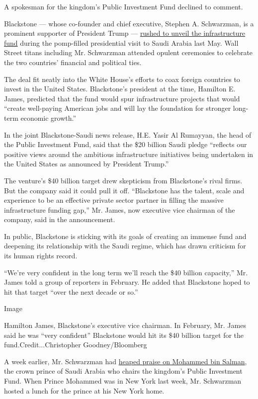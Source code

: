 A spokesman for the kingdom's Public Investment Fund declined to
comment.

Blackstone --- whose co-founder and chief executive, Stephen A.
Schwarzman, is a prominent supporter of President Trump ---
\href{https://www.nytimes3xbfgragh.onion/2017/08/19/business/the-benefits-of-standing-by-the-president.html}{rushed
to unveil the infrastructure fund} during the pomp-filled presidential
visit to Saudi Arabia last May. Wall Street titans including Mr.
Schwarzman attended opulent ceremonies to celebrate the two countries'
financial and political ties.

The deal fit neatly into the White House's efforts to coax foreign
countries to invest in the United States. Blackstone's president at the
time, Hamilton E. James, predicted that the fund would spur
infrastructure projects that would ``create well-paying American jobs
and will lay the foundation for stronger long-term economic growth.''

In the joint Blackstone-Saudi news release, H.E. Yasir Al Rumayyan, the
head of the Public Investment Fund, said that the \$20 billion Saudi
pledge ``reflects our positive views around the ambitious infrastructure
initiatives being undertaken in the United States as announced by
President Trump.''

The venture's \$40 billion target drew skepticism from Blackstone's
rival firms. But the company said it could pull it off. ``Blackstone has
the talent, scale and experience to be an effective private sector
partner in filling the massive infrastructure funding gap,'' Mr. James,
now executive vice chairman of the company, said in the announcement.

In public, Blackstone is sticking with its goals of creating an immense
fund and deepening its relationship with the Saudi regime, which has
drawn criticism for its human rights record.

``We're very confident in the long term we'll reach the \$40 billion
capacity,'' Mr. James told a group of reporters in February. He added
that Blackstone hoped to hit that target ``over the next decade or so.''

Image

Hamilton James, Blackstone's executive vice chairman. In February, Mr.
James said he was ``very confident'' Blackstone would hit its \$40
billion target for the fund.Credit...Christopher Goodney/Bloomberg

A week earlier, Mr. Schwarzman had
\href{https://www.cnbc.com/2018/01/25/blackstone-ceo-schwarzman-saudi-arabia-reforms-are-extraordinary.html}{heaped
praise on Mohammed bin Salman}, the crown prince of Saudi Arabia who
chairs the kingdom's Public Investment Fund. When Prince Mohammed was in
New York last week, Mr. Schwarzman hosted a lunch for the prince at his
New York home.

